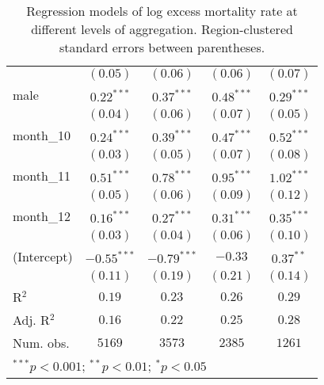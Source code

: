 \begin{table}
\begin{center}
\begin{small}
\begin{tabular}{l c c c c}
               & $(0.05)$      & $(0.06)$      & $(0.06)$      & $(0.07)$      \\
male           & $0.22^{***}$  & $0.37^{***}$  & $0.48^{***}$  & $0.29^{***}$  \\
               & $(0.04)$      & $(0.06)$      & $(0.07)$      & $(0.05)$      \\
month\_10      & $0.24^{***}$  & $0.39^{***}$  & $0.47^{***}$  & $0.52^{***}$  \\
               & $(0.03)$      & $(0.05)$      & $(0.07)$      & $(0.08)$      \\
month\_11      & $0.51^{***}$  & $0.78^{***}$  & $0.95^{***}$  & $1.02^{***}$  \\
               & $(0.05)$      & $(0.06)$      & $(0.09)$      & $(0.12)$      \\
month\_12      & $0.16^{***}$  & $0.27^{***}$  & $0.31^{***}$  & $0.35^{***}$  \\
               & $(0.03)$      & $(0.04)$      & $(0.06)$      & $(0.10)$      \\
(Intercept)    & $-0.55^{***}$ & $-0.79^{***}$ & $-0.33$       & $0.37^{**}$   \\
               & $(0.11)$      & $(0.19)$      & $(0.21)$      & $(0.14)$      \\
\hline
R$^2$          & $0.19$        & $0.23$        & $0.26$        & $0.29$        \\
Adj. R$^2$     & $0.16$        & $0.22$        & $0.25$        & $0.28$        \\
Num. obs.      & $5169$        & $3573$        & $2385$        & $1261$        \\
\hline
\multicolumn{5}{l}{\tiny{$^{***}p<0.001$; $^{**}p<0.01$; $^{*}p<0.05$}}
\end{tabular}
\end{small}
\caption{Regression models of log excess mortality rate at different levels of aggregation. Region-clustered standard errors between parentheses.}
\label{tab:regionmodels}
\end{center}
\end{table}
